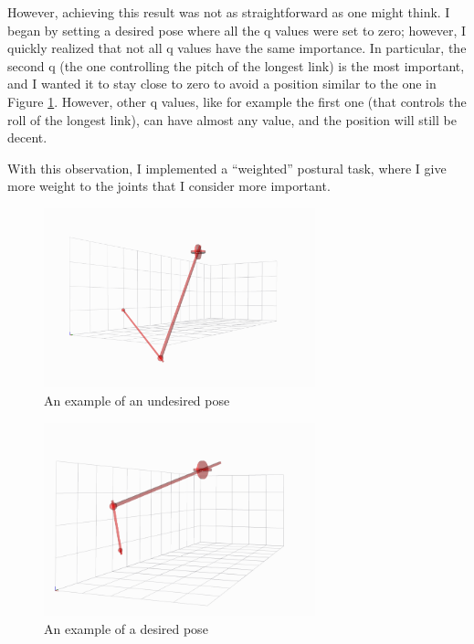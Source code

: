 \documentclass[12pt,a4paper]{article}
\begin{document}
However, achieving this result was not as straightforward as one might think. I began by setting a desired
pose where all the q values were set to zero; however, I quickly realized that not all q values have the same importance.
In particular, the second q (the one controlling the pitch of the longest link) is the most important, and 
I wanted it to stay close to zero to avoid a position similar to the one in Figure \ref{fig:undesired_pose}.
However, other q values, like for example the first one (that controls the roll of the longest link),
can have almost any value, and the position will still be decent.

With this observation, I implemented a ``weighted'' postural task, where I give more weight
to the joints that I consider more important.

\begin{figure}[H]
    \centering
    \includegraphics[width=0.7\textwidth]{images/final_position_low.png}
    \caption{An example of an undesired pose}
    \label{fig:undesired_pose}
\end{figure}


\begin{figure}[H]
    \centering
    \includegraphics[width=0.7\textwidth]{images/final_positino_high.png}
    \caption{An example of a desired pose}
    \label{fig:desired_pose}
\end{figure}
\end{document}
